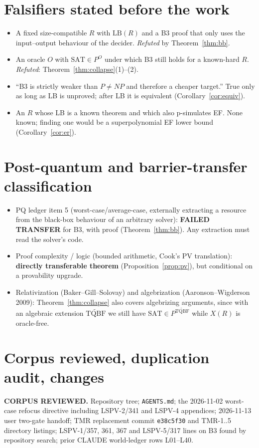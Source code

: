 \documentclass[11pt]{article}
\theoremstyle{definition}
\theoremstyle{remark}
\newcommand{\SAT}{\mathrm{SAT}}
\newcommand{\TQBF}{\mathrm{TQBF}}
\begin{document}
\section{Falsifiers stated before the work}
\begin{itemize}
\item[F1] A fixed size-compatible $R$ with $\mathrm{LB}(R)$ and a B3 proof that only uses the
input--output behaviour of the decider. \emph{Refuted} by Theorem~\ref{thm:bb}.
\item[F2] An oracle $O$ with $\SAT\in P^O$ under which B3 still holds for a known-hard $R$.
\emph{Refuted}: Theorem~\ref{thm:collapse}(1)--(2).
\item[F3] ``B3 is strictly weaker than $P\neq NP$ and therefore a cheaper target.'' True only as
long as LB is unproved; after LB it is equivalent (Corollary~\ref{cor:equiv}).
\item[F4] An $R$ whose LB is a known theorem and which also p-simulates EF. None known; finding
one would be a superpolynomial EF lower bound (Corollary~\ref{cor:er}).
\end{itemize}

\section{Post-quantum and barrier-transfer classification}
\begin{itemize}
\item PQ ledger item 5 (worst-case/average-case, externally extracting a resource from the
black-box behaviour of an arbitrary solver): \textbf{FAILED TRANSFER} for B3, with proof
(Theorem~\ref{thm:bb}). Any extraction must read the solver's code.
\item Proof complexity / logic (bounded arithmetic, Cook's PV translation): \textbf{directly
transferable theorem} (Proposition~\ref{prop:pv}), but conditional on a provability upgrade.
\item Relativization (Baker--Gill--Solovay) and algebrization (Aaronson--Wigderson 2009):
Theorem~\ref{thm:collapse} also covers algebrizing arguments, since with an algebraic extension
$\widetilde{\TQBF}$ we still have $\SAT\in P^{\widetilde{\TQBF}}$ while $X(R)$ is oracle-free.
\end{itemize}

\section{Corpus reviewed, duplication audit, changes}
\textbf{CORPUS REVIEWED.} Repository tree; \texttt{AGENTS.md}; the 2026-11-02 worst-case refocus
directive including LSPV-2/341 and LSPV-4 appendices; 2026-11-13 user two-gate handoff;
TMR replacement commit \texttt{e38c5f30} and TMR-1..5 directory listings; LSPV-1/357, 361, 367
and LSPV-5/317 lines on B3 found by repository search; prior CLAUDE world-ledger rows L01--L40.
\end{document}
